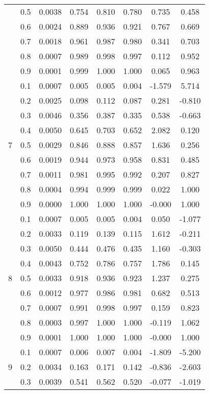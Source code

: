 \documentclass[11pt,a4paper]{report}
\begin{document}
\begin{longtable}{ | c | c || c | c | c | c | c | c | }
 & 0.5 & 0.0038 & 0.754 & 0.810 & 0.780 & 0.735 & 0.458 \\
 & 0.6 & 0.0024 & 0.889 & 0.936 & 0.921 & 0.767 & 0.669 \\
 & 0.7 & 0.0018 & 0.961 & 0.987 & 0.980 & 0.341 & 0.703 \\
 & 0.8 & 0.0007 & 0.989 & 0.998 & 0.997 & 0.112 & 0.952 \\
 & 0.9 & 0.0001 & 0.999 & 1.000 & 1.000 & 0.065 & 0.963 \\
 \hline
\multirow{9}{*}{7} & 0.1 & 0.0007 & 0.005 & 0.005 & 0.004 & -1.579 & 5.714 \\
 & 0.2 & 0.0025 & 0.098 & 0.112 & 0.087 & 0.281 & -0.810 \\
 & 0.3 & 0.0046 & 0.356 & 0.387 & 0.335 & 0.538 & -0.663 \\
 & 0.4 & 0.0050 & 0.645 & 0.703 & 0.652 & 2.082 & 0.120 \\
 & 0.5 & 0.0029 & 0.846 & 0.888 & 0.857 & 1.636 & 0.256 \\
 & 0.6 & 0.0019 & 0.944 & 0.973 & 0.958 & 0.831 & 0.485 \\
 & 0.7 & 0.0011 & 0.981 & 0.995 & 0.992 & 0.207 & 0.827 \\
 & 0.8 & 0.0004 & 0.994 & 0.999 & 0.999 & 0.022 & 1.000 \\
 & 0.9 & 0.0000 & 1.000 & 1.000 & 1.000 & -0.000 & 1.000 \\
 \hline
\multirow{9}{*}{8} & 0.1 & 0.0007 & 0.005 & 0.005 & 0.004 & 0.050 & -1.077 \\
 & 0.2 & 0.0033 & 0.119 & 0.139 & 0.115 & 1.612 & -0.211 \\
 & 0.3 & 0.0050 & 0.444 & 0.476 & 0.435 & 1.160 & -0.303 \\
 & 0.4 & 0.0043 & 0.752 & 0.786 & 0.757 & 1.786 & 0.145 \\
 & 0.5 & 0.0033 & 0.918 & 0.936 & 0.923 & 1.237 & 0.275 \\
 & 0.6 & 0.0012 & 0.977 & 0.986 & 0.981 & 0.682 & 0.513 \\
 & 0.7 & 0.0007 & 0.991 & 0.998 & 0.997 & 0.159 & 0.823 \\
 & 0.8 & 0.0003 & 0.997 & 1.000 & 1.000 & -0.119 & 1.062 \\
 & 0.9 & 0.0001 & 1.000 & 1.000 & 1.000 & -0.000 & 1.000 \\
 \hline
\multirow{9}{*}{9} & 0.1 & 0.0007 & 0.006 & 0.007 & 0.004 & -1.809 & -5.200 \\
 & 0.2 & 0.0034 & 0.163 & 0.171 & 0.142 & -0.836 & -2.603 \\
 & 0.3 & 0.0039 & 0.541 & 0.562 & 0.520 & -0.077 & -1.019 \\

\end{longtable}
\end{document}
